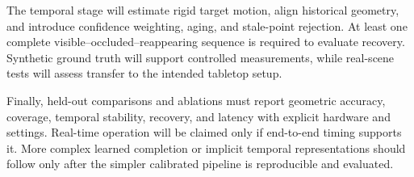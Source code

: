 The temporal stage will estimate rigid target motion, align historical geometry, and introduce confidence weighting, aging, and stale-point rejection. At least one complete visible--occluded--reappearing sequence is required to evaluate recovery. Synthetic ground truth will support controlled measurements, while real-scene tests will assess transfer to the intended tabletop setup.

Finally, held-out comparisons and ablations must report geometric accuracy, coverage, temporal stability, recovery, and latency with explicit hardware and settings. Real-time operation will be claimed only if end-to-end timing supports it. More complex learned completion or implicit temporal representations should follow only after the simpler calibrated pipeline is reproducible and evaluated.
